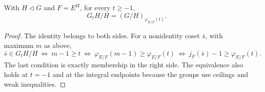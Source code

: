 \begin{theorem}
\label{fw:herbrand-lower-quotients}
\leanok
With $H\triangleleft G$ and $F=E^H$, for every $t\geq-1$,
\[
 G_tH/H=(G/H)_{\varphi_{E/F}(t)}.
\]
\end{theorem}
\begin{proof}
The identity belongs to both sides. For a nonidentity coset $\bar s$,
with maximum $m$ as above,
\[
 \bar s\in G_tH/H
 \ \Longleftrightarrow\ m-1\geq t
 \ \Longleftrightarrow\ \varphi_{E/F}(m-1)\geq\varphi_{E/F}(t)
 \ \Longleftrightarrow\ j_F(\bar s)-1\geq\varphi_{E/F}(t).
\]
The last condition is exactly membership in the right side. The
equivalence also holds at $t=-1$ and at the integral endpoints because
the groups use ceilings and weak inequalities.
\end{proof}

